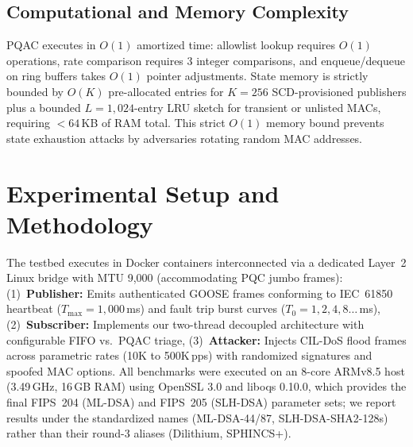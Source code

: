 \documentclass[journal]{IEEEtran}
\begin{document}
\subsection{Computational and Memory Complexity}
PQAC executes in $O(1)$ amortized time: allowlist lookup requires $O(1)$ operations, rate comparison requires 3 integer comparisons, and enqueue/dequeue on ring buffers takes $O(1)$ pointer adjustments. State memory is strictly bounded by $O(K)$ pre-allocated entries for $K=256$ SCD-provisioned publishers plus a bounded $L=1{,}024$-entry LRU sketch for transient or unlisted MACs, requiring $<64$\,KB of RAM total. This strict $O(1)$ memory bound prevents state exhaustion attacks by adversaries rotating random MAC addresses.

\section{Experimental Setup and Methodology}
\label{sec:experiments}

The testbed executes in Docker containers interconnected via a dedicated Layer~2 Linux bridge with MTU 9,000 (accommodating PQC jumbo frames):
(1)~\textbf{Publisher:} Emits authenticated GOOSE frames conforming to IEC~61850 heartbeat ($T_{\max} = 1{,}000$\,ms) and fault trip burst curves ($T_0 = 1, 2, 4, 8\dots$\,ms),
(2)~\textbf{Subscriber:} Implements our two-thread decoupled architecture with configurable FIFO vs.\ PQAC triage,
(3)~\textbf{Attacker:} Injects CIL-DoS flood frames across parametric rates (10K to 500K\,pps) with randomized signatures and spoofed MAC options.
All benchmarks were executed on an 8-core ARMv8.5 host (3.49\,GHz, 16\,GB RAM) using OpenSSL 3.0 and liboqs 0.10.0, which provides the final FIPS~204 (ML-DSA) and FIPS~205 (SLH-DSA) parameter sets; we report results under the standardized names (ML-DSA-44/87, SLH-DSA-SHA2-128s) rather than their round-3 aliases (Dilithium, SPHINCS+).
\end{document}
